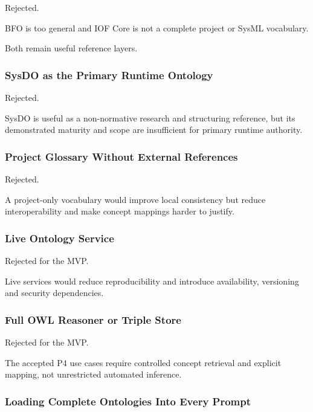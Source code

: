 Rejected.

BFO is too general and IOF Core is not a complete project or SysML vocabulary.

Both remain useful reference layers.

\hypertarget{sysdo-as-the-primary-runtime-ontology}{%
\subsubsection{SysDO as the Primary Runtime Ontology}\label{sysdo-as-the-primary-runtime-ontology}}

Rejected.

SysDO is useful as a non-normative research and structuring reference, but its demonstrated maturity and scope are insufficient for primary runtime authority.

\hypertarget{project-glossary-without-external-references}{%
\subsubsection{Project Glossary Without External References}\label{project-glossary-without-external-references}}

Rejected.

A project-only vocabulary would improve local consistency but reduce interoperability and make concept mappings harder to justify.

\hypertarget{live-ontology-service}{%
\subsubsection{Live Ontology Service}\label{live-ontology-service}}

Rejected for the MVP.

Live services would reduce reproducibility and introduce availability, versioning and security dependencies.

\hypertarget{full-owl-reasoner-or-triple-store}{%
\subsubsection{Full OWL Reasoner or Triple Store}\label{full-owl-reasoner-or-triple-store}}

Rejected for the MVP.

The accepted P4 use cases require controlled concept retrieval and explicit mapping, not unrestricted automated inference.

\hypertarget{loading-complete-ontologies-into-every-prompt}{%
\subsubsection{Loading Complete Ontologies Into Every Prompt}\label{loading-complete-ontologies-into-every-prompt}}

